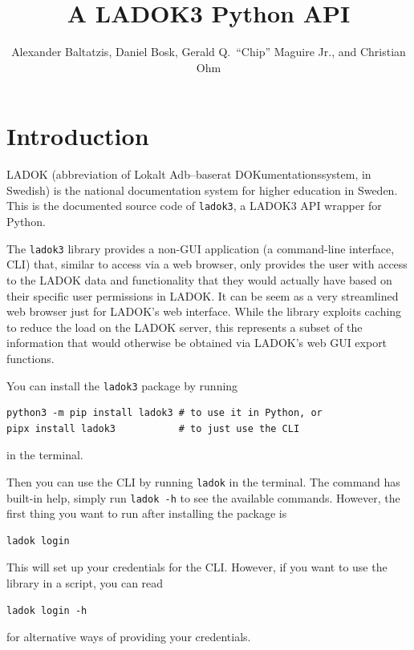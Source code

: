 \documentclass[a4paper,oneside]{memoir}
\title{%
  A LADOK3 Python API
}
\author{%
  Alexander Baltatzis,
  Daniel Bosk,
  Gerald Q.\ \enquote{Chip} Maguire Jr.,
  and
  Christian Ohm
}
\affil{%
  KTH EECS\\
  \texttt{\{alba,dbosk,maguire,chohm\}@kth.se}
}
\begin{document}
\frontmatter
\maketitle

\vspace*{\fill}
\clearpage

\begin{abstract}
  
\end{abstract}
\clearpage

\tableofcontents*
\clearpage

\mainmatter
\chapter{Introduction}

LADOK (abbreviation of \foreignlanguage{swedish}{Lokalt Adb–baserat 
DOKumentationssystem}, in Swedish) is the national documentation system for 
higher education in Sweden.
This is the documented source code of \texttt{ladok3}, a LADOK3 API wrapper for 
Python.

The \texttt{ladok3} library provides a non-GUI application (a command-line 
interface, CLI) that, similar to access via a web browser, only provides the 
user with access to the LADOK data and functionality that they would actually 
have based on their specific user permissions in LADOK.
It can be seem as a very streamlined web browser just for LADOK's web 
interface.
While the library exploits caching to reduce the load on the LADOK server, this 
represents a subset of the information that would otherwise be obtained via
LADOK's web GUI export functions.

You can install the \texttt{ladok3} package by running
\begin{verbatim}
python3 -m pip install ladok3 # to use it in Python, or
pipx install ladok3           # to just use the CLI
\end{verbatim}
in the terminal.

Then you can use the CLI by running \texttt{ladok} in the terminal.
The command has built-in help, simply run \texttt{ladok -h} to see 
the available commands.
However, the first thing you want to run after installing the package is
\begin{verbatim}
ladok login
\end{verbatim}
This will set up your credentials for the CLI.
However, if you want to use the library in a script, you can read
\begin{verbatim}
ladok login -h
\end{verbatim}
for alternative ways of providing your credentials.
\end{document}
